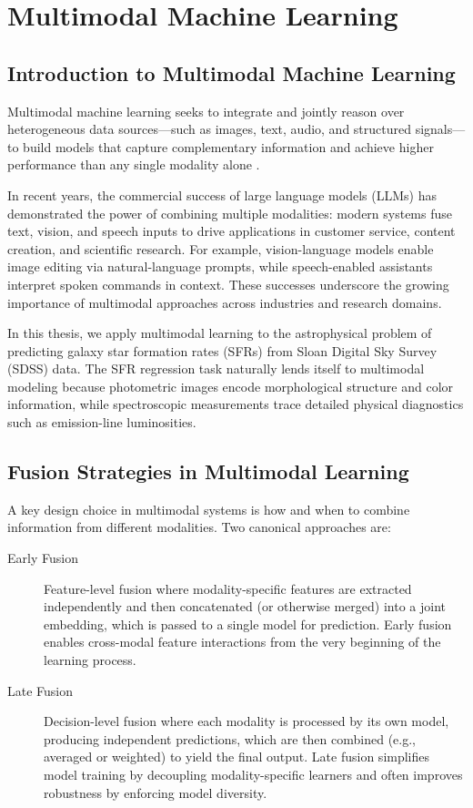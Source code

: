 \documentclass[english,bachelor,oneside]{ctufit-thesis}
\begin{document}
\chapter{Multimodal Machine Learning}
\label{ch:multimodal_ml}

\section{Introduction to Multimodal Machine Learning}
Multimodal machine learning seeks to integrate and jointly reason over heterogeneous data sources—such as images, text, audio, and structured signals—to build models that capture complementary information and achieve higher performance than any single modality alone \cite{Baltrusaitis2018}.

In recent years, the commercial success of large language models (LLMs) has demonstrated the power of combining multiple modalities: modern systems fuse text, vision, and speech inputs to drive applications in customer service, content creation, and scientific research. For example, vision-language models enable image editing via natural-language prompts, while speech-enabled assistants interpret spoken commands in context. These successes underscore the growing importance of multimodal approaches across industries and research domains.

In this thesis, we apply multimodal learning to the astrophysical problem of predicting galaxy star formation rates (SFRs) from Sloan Digital Sky Survey (SDSS) data. The SFR regression task naturally lends itself to multimodal modeling because photometric images encode morphological structure and color information, while spectroscopic measurements trace detailed physical diagnostics such as emission-line luminosities.

\section{Fusion Strategies in Multimodal Learning}
A key design choice in multimodal systems is how and when to combine information from different modalities. Two canonical approaches are:

\begin{description}
\item[Early Fusion] Feature-level fusion where modality-specific features are extracted independently and then concatenated (or otherwise merged) into a joint embedding, which is passed to a single model for prediction. Early fusion enables cross-modal feature interactions from the very beginning of the learning process. \cite{Illustra28:online}

\item[Late Fusion] Decision-level fusion where each modality is processed by its own model, producing independent predictions, which are then combined (e.g., averaged or weighted) to yield the final output. Late fusion simplifies model training by decoupling modality-specific learners and often improves robustness by enforcing model diversity. \cite{Illustra28:online}
\end{description}
\end{document}
